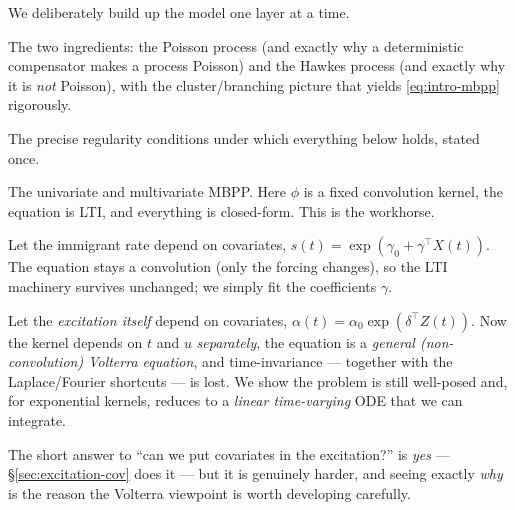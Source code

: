 We deliberately build up the model one layer at a time.
\begin{description}[leftmargin=1.4em,style=nextline]
\item[\S\ref{sec:poisson-hawkes} Poisson and Hawkes.] The two ingredients:
the Poisson process (and exactly why a deterministic compensator makes a process
Poisson) and the Hawkes process (and exactly why it is \emph{not} Poisson), with
the cluster/branching picture that yields \eqref{eq:intro-mbpp} rigorously.
\item[\S\ref{sec:assumptions} Standing assumptions.] The precise regularity
conditions under which everything below holds, stated once.
\item[\S\ref{sec:no-covariates} Without covariates.] The univariate and
multivariate MBPP. Here $\phi$ is a fixed convolution kernel, the equation is LTI,
and everything is closed-form. This is the workhorse.
\item[\S\ref{sec:baseline-cov} Baseline covariates.] Let the immigrant rate
depend on covariates, $s(t)=\exp(\gamma_0+\gamma^\top X(t))$. The equation stays a
convolution (only the forcing changes), so the LTI machinery survives unchanged;
we simply fit the coefficients $\gamma$.
\item[\S\ref{sec:excitation-cov} Excitation covariates (the hard case).] Let the
\emph{excitation itself} depend on covariates, $\alpha(t)=\alpha_0\exp(\delta^\top
Z(t))$. Now the kernel depends on $t$ and $u$ \emph{separately}, the equation is a
\emph{general (non-convolution) Volterra equation}, and time-invariance ---
together with the Laplace/Fourier shortcuts --- is lost. We show the problem is
still well-posed and, for exponential kernels, reduces to a \emph{linear
time-varying} ODE that we can integrate.
\end{description}

\noindent
The short answer to ``can we put covariates in the excitation?'' is
\emph{yes} --- \S\ref{sec:excitation-cov} does it --- but it is genuinely harder,
and seeing exactly \emph{why} is the reason the Volterra viewpoint is worth
developing carefully.
